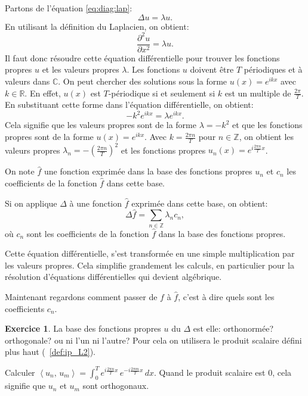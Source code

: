 \documentclass[11pt,a4paper]{article}
\numberwithin{equation}{section}
\theoremstyle{plain}
\theoremstyle{definition}
\newtheorem{exercise}[theorem]{Exercice}
\theoremstyle{remark}
\newcommand{\C}{\mathbb{C}}
\newcommand{\ip}[2]{\left\langle #1,\, #2\right\rangle}
\newcommand{\Lap}{\Delta}
\begin{document}
\begin{solution}
    Partons de l'équation \eqref{eq:diag:lap}:
    \[
        \Lap u = \lambda u.
    \]
    En utilisant la définition du Laplacien, on obtient:
    \[
        \frac{\partial^2 u}{\partial x^2} = \lambda u.
    \]
    Il faut donc résoudre cette équation différentielle pour trouver les fonctions propres $u$ et les valeurs propres $\lambda$.
    Les fonctions $u$ doivent être $T$ périodiques et à valeurs dans $\C$.
    On peut chercher des solutions sous la forme $u(x) = e^{ikx}$ avec $k \in \mathbb{R}$. En effet, $u(x)$ est $T$-périodique si et seulement si $k$ est un multiple de $\frac{2\pi}{T}$.
    En substituant cette forme dans l'équation différentielle, on obtient:
    \[
        -k^2 e^{ikx} = \lambda e^{ikx}.
    \]
    Cela signifie que les valeurs propres sont de la forme $\lambda = -k^2$ et que les fonctions propres sont de la forme $u(x) = e^{ikx}$.
    Avec $k = \frac{2\pi n}{T}$ pour $n \in \mathbb{Z}$, on obtient les valeurs propres $\lambda_n = -\left(\frac{2\pi n}{T}\right)^2$ et les fonctions propres $u_n(x) = e^{i\frac{2\pi n}{T}x}$.
\end{solution}

On note $\hat{f}$ une fonction exprimée dans la base des fonctions propres $u_n$ et $c_n$ les coefficients de la fonction $\hat{f}$ dans cette base.

Si on applique $\Lap$ à une fonction $\hat{f}$ exprimée dans cette base, on obtient:
\[
    \Lap \hat{f} = \sum_{n \in \mathbb{Z}} \lambda_n c_n,
\]
où $c_n$ sont les coefficients de la fonction $\hat{f}$ dans la base des fonctions propres.

Cette équation différentielle, s'est transformée en une simple multiplication par les valeurs propres. Cela simplifie grandement les calculs, en particulier pour la résolution d'équations différentielles qui devient algébrique.

Maintenant regardons comment passer de $f$ à $\hat{f}$, c'est à dire quels sont les coefficients $c_n$.

\begin{exercise}
    La base des fonctions propres $u$ du $\Lap$ est elle: orthonormée? orthogonale? ou ni l'un ni l'autre?
    Pour cela on utilisera le produit scalaire défini plus haut (~\ref{def:ip_L2}).
\end{exercise}

\begin{indication}
    Calculer $\ip{u_n}{u_m}=\int_0^T e^{i\frac{2\pi n}{T}x} \, e^{-i\frac{2\pi m}{T}x}\,dx$.
    Quand le produit scalaire est $0$, cela signifie que $u_n$ et $u_m$ sont orthogonaux.
\end{indication}
\end{document}
